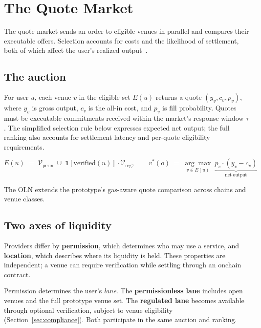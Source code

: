 \section{The Quote Market}\label{sec:quote-market}

The quote market sends an order to eligible venues in parallel and compares their executable offers. Selection accounts for costs and the likelihood of settlement, both of which affect the user's realized output~\cite{solverwelfare}.

\subsection{The auction}

For user $u$, each venue $v$ in the eligible set $E(u)$ returns a quote $(y_v, c_v, p_v)$, where $y_v$ is gross output, $c_v$ is the all-in cost, and $p_v$ is fill probability. Quotes must be executable commitments received within the market's response window $\tau$. The simplified selection rule below expresses expected net output; the full ranking also accounts for settlement latency and per-quote eligibility requirements.

\begin{equation}
E(u) \;=\; \mathcal{V}_{\mathrm{perm}} \;\cup\; \mathbf{1}[\mathrm{verified}(u)]\cdot \mathcal{V}_{\mathrm{reg}},
\qquad
v^{*}(o) \;=\; \underset{v \in E(u)}{\arg\max}\; \underbrace{p_v \cdot (y_v - c_v)}_{\mathrm{net\; output}}
\end{equation}

\noindent The OLN extends the prototype's gas-aware quote comparison across chains and venue classes.

\subsection{Two axes of liquidity}\label{sec:lanes}

Providers differ by \textbf{permission}, which determines who may use a service, and \textbf{location}, which describes where its liquidity is held. These properties are independent; a venue can require verification while settling through an onchain contract.

Permission determines the user's \emph{lane}. The \textbf{permissionless lane} includes open venues and the full prototype venue set. The \textbf{regulated lane} becomes available through optional verification, subject to venue eligibility (Section~\ref{sec:compliance}). Both participate in the same auction and ranking.

